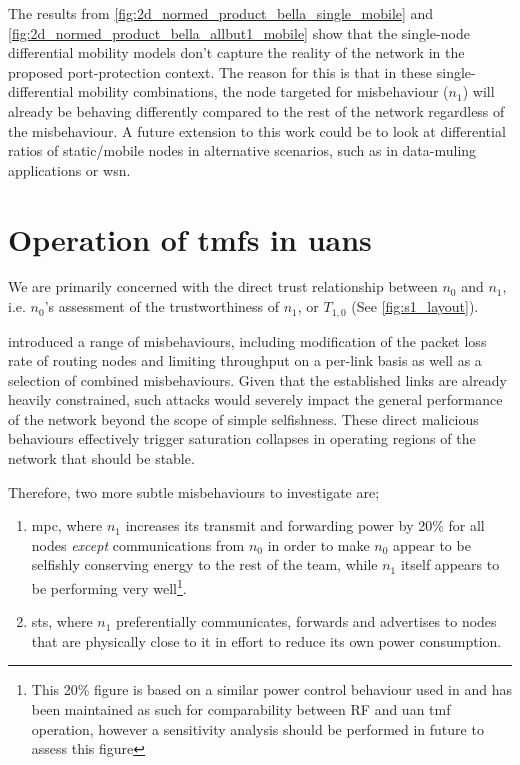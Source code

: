 The results from \autoref{fig:2d_normed_product_bella_single_mobile} and \autoref{fig:2d_normed_product_bella_allbut1_mobile} show that the single-node differential mobility models don't capture the reality of the network in the proposed port-protection context.
The reason for this is that in these single-differential mobility combinations, the node targeted for misbehaviour ($n_1$) will already be behaving differently compared to the rest of the network regardless of the misbehaviour.
A future extension to this work could be to look at differential ratios of static/mobile nodes in alternative scenarios, such as in data-muling applications or \gls{wsn}.

\section{Operation of \glspl{tmf} in \glspl{uan}}\label{sec:uantmf}

We are primarily concerned with the direct trust relationship between $n_0$ and $n_1$, i.e. $n_0$'s assessment of the trustworthiness of $n_1$, or $T_{1,0}$ (See \autoref{fig:s1_layout}).

\citet{Guo11} introduced a range of misbehaviours, including modification of the packet loss rate of routing nodes and limiting throughput on a per-link basis as well as a selection of combined misbehaviours. 
Given that the established links are already heavily constrained, such attacks would severely impact the general performance of the network beyond the scope of simple selfishness.
These direct malicious behaviours effectively trigger saturation collapses in operating regions of the network that should be stable.

Therefore, two more subtle misbehaviours to investigate are; 
\begin{enumerate}
	\item \acrfull{mpc}, where $n_1$ increases its transmit and forwarding power by 20\% for all nodes \emph{except} communications from $n_0$ in order to make $n_0$ appear to be selfishly conserving energy to the rest of the team, while $n_1$ itself appears to be performing very well\footnote{This 20\% figure is based on a similar power control behaviour used in \cite{Guo11} and has been maintained as such for comparability between RF and \gls{uan} \gls{tmf} operation, however a sensitivity analysis should be performed in future to assess this figure}.
	\item \acrfull{sts}, where $n_1$ preferentially communicates, forwards and advertises to nodes that are physically close to it in effort to reduce its own power consumption.
\end{enumerate}


